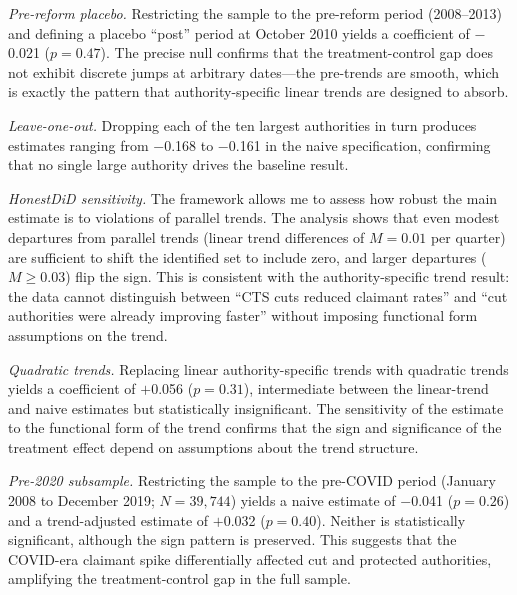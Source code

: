 \documentclass[12pt]{article}
\begin{document}
\emph{Pre-reform placebo.} Restricting the sample to the pre-reform period (2008--2013) and defining a placebo ``post'' period at October 2010 yields a coefficient of $-$0.021 ($p = 0.47$). The precise null confirms that the treatment-control gap does not exhibit discrete jumps at arbitrary dates---the pre-trends are smooth, which is exactly the pattern that authority-specific linear trends are designed to absorb.

\emph{Leave-one-out.} Dropping each of the ten largest authorities in turn produces estimates ranging from $-$0.168 to $-$0.161 in the naive specification, confirming that no single large authority drives the baseline result.

\emph{HonestDiD sensitivity.} The \citet{rambachan2023more} framework allows me to assess how robust the main estimate is to violations of parallel trends. The analysis shows that even modest departures from parallel trends (linear trend differences of $M = 0.01$ per quarter) are sufficient to shift the identified set to include zero, and larger departures ($M \geq 0.03$) flip the sign. This is consistent with the authority-specific trend result: the data cannot distinguish between ``CTS cuts reduced claimant rates'' and ``cut authorities were already improving faster'' without imposing functional form assumptions on the trend.

\emph{Quadratic trends.} Replacing linear authority-specific trends with quadratic trends yields a coefficient of $+$0.056 ($p = 0.31$), intermediate between the linear-trend and naive estimates but statistically insignificant. The sensitivity of the estimate to the functional form of the trend confirms that the sign and significance of the treatment effect depend on assumptions about the trend structure.

\emph{Pre-2020 subsample.} Restricting the sample to the pre-COVID period (January 2008 to December 2019; $N = 39{,}744$) yields a naive estimate of $-$0.041 ($p = 0.26$) and a trend-adjusted estimate of $+$0.032 ($p = 0.40$). Neither is statistically significant, although the sign pattern is preserved. This suggests that the COVID-era claimant spike differentially affected cut and protected authorities, amplifying the treatment-control gap in the full sample.
\end{document}
